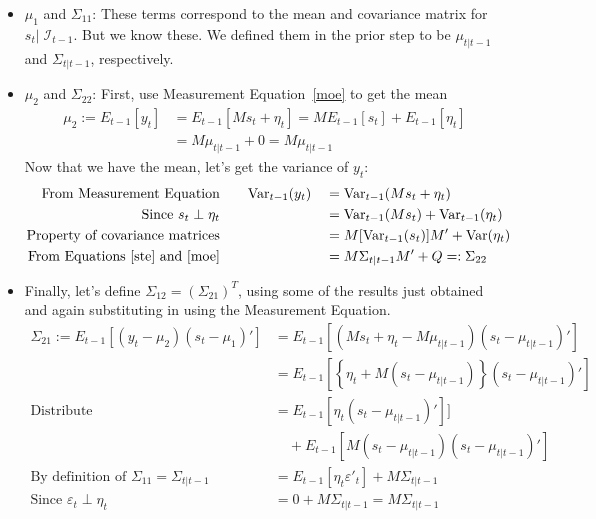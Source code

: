 \documentclass[a4paper,12pt]{article}
\begin{document}
\begin{itemize}
  \item $\mu_1$ and $\Sigma_{11}$: These terms correspond
    to the mean and covariance matrix for $s_t |\;
    \mathcal{I}_{t-1}$. But we know these. We defined them
    in the prior step to be $\mu_{t|t-1}$ and
    $\Sigma_{t|t-1}$, respectively. 

  \item $\mu_2$ and $\Sigma_{22}$: First, use Measurement
    Equation~\ref{moe} to get the mean
    \begin{align*}
      \mu_2 := E_{t-1}[y_t ] &= 
        E_{t-1}[Ms_t + \eta_t ] =
        ME_{t-1}[s_t] 
        + E_{t-1}[\eta_t ]\\
        &= M \mu_{t|t-1} + 0 = M\mu_{t|t-1}
    \end{align*}
    Now that we have the mean, let's get the variance of $y_t$: 
    \begin{alignat*}{2}
      \text{From Measurement Equation} &\qquad
        \text{Var}_{t-1}(y_t) 
        &&= \text{Var}_{t-1}(Ms_t + \eta_t) \\
      \text{Since $s_t\perp\eta_t$} &\qquad 
        &&= \text{Var}_{t-1}(Ms_t) 
        + \text{Var}_{t-1}(\eta_t)\\
      \text{Property of covariance matrices} &\qquad 
        &&= M [\text{Var}_{t-1}(s_t)] M' 
        + \text{Var}(\eta_t) \\
      \text{From Equations~\ref{ste} and~\ref{moe}} &\qquad 
        &&= M\Sigma_{t|t-1} M' + Q =: \Sigma_{22}
    \end{alignat*}
    
  \item Finally, let's define $\Sigma_{12} =
    (\Sigma_{21})^T$, using some of the results just
    obtained and again substituting in using the
    Measurement Equation.
    \begin{align*}
      \Sigma_{21} := E_{t-1}\left[(y_t-\mu_2)(s_t - \mu_1)'
        \right] &= 
        E_{t-1}\left[(Ms_t+\eta_t-M\mu_{t|t-1})(s_t-\mu_{t|t-1})'
        \right]  \\
      &= E_{t-1}\left[\left\{\eta_t+ M(s_t-\mu_{t|t-1})\right\}
        (s_t-\mu_{t|t-1})' \right]  \\
      \text{Distribute}
      \qquad
      &= E_{t-1}\left[\eta_t(s_t-\mu_{t|t-1})'\right]]\\
      &\quad + E_{t-1}\left[M(s_t-\mu_{t|t-1})
        (s_t-\mu_{t|t-1})'\right]  \\
      \text{By definition of $\Sigma_{11}=\Sigma_{t|t-1}$}
      \qquad
      &= E_{t-1}\left[\eta_t\varepsilon'_t\right]
        + M\Sigma_{t|t-1} \\
      \text{Since $\varepsilon_t\perp \eta_t$} \qquad
      &= 0 + M\Sigma_{t|t-1}  = M\Sigma_{t|t-1} 
    \end{align*}
\end{itemize}
\end{document}
